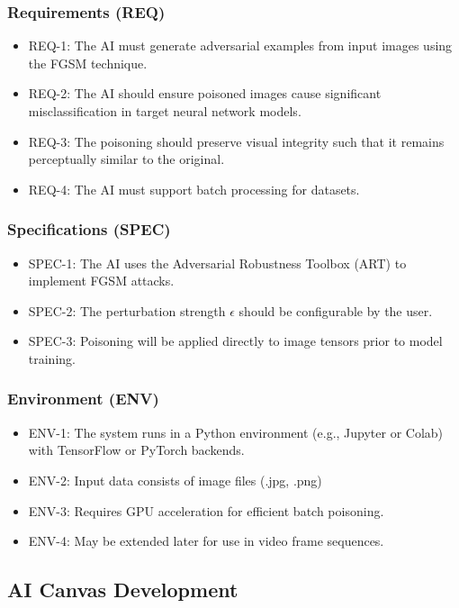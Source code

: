 \subsubsection*{Requirements (REQ)}
\begin{itemize}
    \item REQ-1: The AI must generate adversarial examples from input images using the FGSM technique.
    \item REQ-2: The AI should ensure poisoned images cause significant misclassification in target neural network models.
    \item REQ-3: The poisoning should preserve visual integrity such that it remains perceptually similar to the original.
    \item REQ-4: The AI must support batch processing for datasets.
\end{itemize}

\subsubsection*{Specifications (SPEC)}
\begin{itemize}
    \item SPEC-1: The AI uses the Adversarial Robustness Toolbox (ART) to implement FGSM attacks.
    \item SPEC-2: The perturbation strength $\epsilon$ should be configurable by the user.
    \item SPEC-3: Poisoning will be applied directly to image tensors prior to model training.
\end{itemize}

\subsubsection*{Environment (ENV)}
\begin{itemize}
    \item ENV-1: The system runs in a Python environment (e.g., Jupyter or Colab) with TensorFlow or PyTorch backends.
    \item ENV-2: Input data consists of image files (.jpg, .png)
    \item ENV-3: Requires GPU acceleration for efficient batch poisoning.
    \item ENV-4: May be extended later for use in video frame sequences.
\end{itemize}

\subsection{AI Canvas Development}

